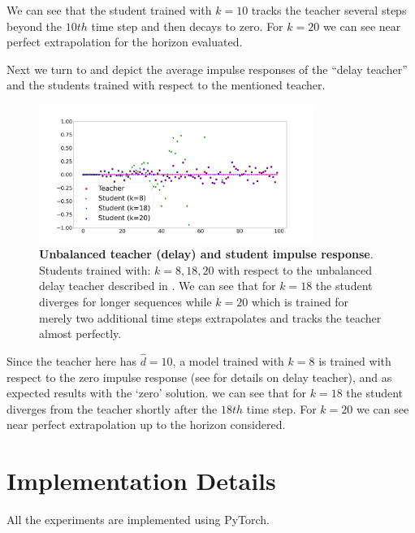 We can see that the student trained with $k=10$ tracks the teacher several steps beyond the $10th$ time step and then decays to zero. For $k=20$ we can see near perfect extrapolation for the horizon evaluated.

Next we turn to  and depict the average impulse responses of the ``delay teacher'' and the students trained with respect to the mentioned teacher.

\begin{figure}[H]
    \centering
    \includegraphics[width=0.8\textwidth]{figures/non_sym_impulse_responses.png}
    \caption{\textbf{Unbalanced teacher (delay) and student impulse response}. Students trained with: $k=8,18,20$ with respect to the unbalanced delay teacher described in . We can see that for $k=18$ the student diverges for longer sequences while $k=20$ which is trained for merely two additional time steps extrapolates and tracks the teacher almost perfectly.}
    \label{fig:apdx:delay_teacher_ir}
\end{figure}

Since the teacher here has $\hat{d}=10$, a model trained with $k=8$ is trained with respect to the zero impulse response (see  for details on delay teacher), and as expected results with the `zero' solution. we can see that for $k=18$ the student diverges from the teacher shortly after the $18th$ time step. For $k=20$ we can see near perfect extrapolation up to the horizon considered.

\section{Implementation Details}\label{sec:apdx:impl_details}

All the experiments are implemented using PyTorch.

